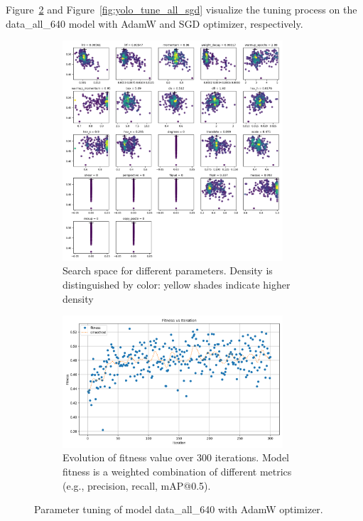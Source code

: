 \documentclass[Master,MDS,english]{BASE/twbook} %
\begin{document}
Figure~\ref{fig:yolo_tune_all_adam} and Figure~\ref{fig:yolo_tune_all_sgd} visualize the tuning process on the data\_all\_640 model  with AdamW and SGD optimizer, respectively.

\begin{figure}
\centering
\begin{subfigure}[t]{.5\textwidth}
  \centering
  \includegraphics[width=0.9\textwidth]{images/yolo/all/adam/tune_scatter_plots}
  \caption{Search space for different parameters. Density is distinguished by color: yellow shades indicate higher density}
\end{subfigure}%
\begin{subfigure}[t]{.5\textwidth}
  \centering
  \includegraphics[width=0.9\textwidth]{images/yolo/all/adam/tune_fitness}
  \caption{Evolution of fitness value over 300 iterations. Model fitness is a weighted combination of different metrics (e.g., precision, recall, mAP@0.5).}
  \label{fig:images_from_videos}
\end{subfigure}
\caption{Parameter tuning of model data\_all\_640 with AdamW optimizer.}
\label{fig:yolo_tune_all_adam}
\end{figure}
\end{document}
